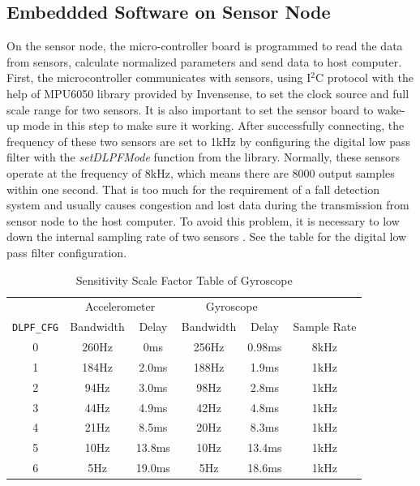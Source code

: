 \documentclass[letterpaper,12pt,titlepage,oneside,final]{book}
\begin{document}
\subsection{Embeddded Software on Sensor Node}
On the sensor node, the micro-controller board is programmed to read the data from sensors, calculate normalized parameters and send data to host computer. First, the microcontroller communicates with sensors, using I$^{2}$C protocol with the help of MPU6050 library provided by Invensense\textregistered, to set the clock source and full scale range for two sensors. It is also important to set the sensor board to wake-up mode in this step to make sure it working.  After successfully connecting, the frequency of these two sensors are set to 1kHz by configuring the digital low pass filter with the \textit{setDLPFMode} function from the library. Normally, these sensors operate at the frequency of 8kHz, which means there are 8000 output samples within one second. That is too much for the requirement of a fall detection system and usually causes congestion and lost data during the transmission from sensor node to the host computer. To avoid this problem, it is necessary to low down the internal sampling rate of two sensors . See the table for the digital low pass filter configuration. \clearpage
\begin{table}[h!]
	\begin{center}
		\begin{tabular}{ |c|c|c|c|c|c| } 
			\hline
			 & \multicolumn{2}{c|}{Accelerometer} & \multicolumn{2}{c|}{Gyroscope} &  \\
			 \cline{2-5}
			 \verb|DLPF_CFG| & Bandwidth & Delay & Bandwidth & Delay & Sample Rate\\ 
			 \hline
			 0 & 260Hz & 0ms & 256Hz & 0.98ms &8kHz \\
			 \hline
			 1 & 184Hz & 2.0ms & 188Hz & 1.9ms & 1kHz\\
			 \hline
			 2 & 94Hz & 3.0ms & 98Hz & 2.8ms & 1kHz\\
			 \hline
			 3 & 44Hz & 4.9ms & 42Hz & 4.8ms & 1kHz\\
			 \hline
			 4 & 21Hz & 8.5ms & 20Hz & 8.3ms & 1kHz\\
			 \hline
			 5 & 10Hz & 13.8ms & 10Hz & 13.4ms & 1kHz\\
			 \hline
			 6 & 5Hz & 19.0ms & 5Hz & 18.6ms & 1kHz\\
			 \hline
		\end{tabular}
		\caption{Sensitivity Scale Factor Table of Gyroscope}
	\end{center}
\end{table}
\end{document}
